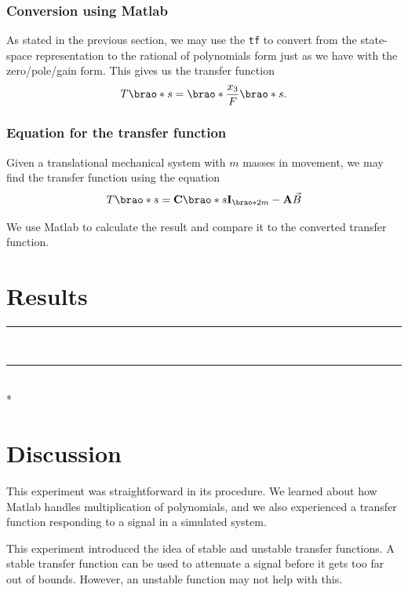 \documentclass[12pt]{article}
\DeclarePairedDelimiter\brao()%
\def\hr{{\par\noindent\rule{\textwidth}{0.4pt}}}
\begin{document}
\subsubsection{Conversion using Matlab}

As stated in the previous section,
we may use the \texttt{tf} to convert from the state-space representation to the rational of polynomials form
just as we have with the zero/pole/gain form.
This gives us the transfer function
\begin{equation}
    T\brao*s = \brao*{\frac{x_3}{F}}\brao*s.
\end{equation}

\subsubsection{Equation for the transfer function}

Given a translational mechanical system with $m$ masses in movement,
we may find the transfer function using the equation
\begin{equation}
    T\brao*s = \mathbf{C}\brao*{s\mathbf{I}_{\brao*{2m}} - \mathbf{A}}\vec{B}
\end{equation}

We use Matlab to calculate the result and compare it to the converted transfer function.

\section{Results}

\hr



\ \hr \\*



\section{Discussion}

This experiment was straightforward in its procedure.
We learned about how Matlab handles multiplication of polynomials,
and we also experienced a transfer function responding to a signal in a simulated system.

This experiment introduced the idea of stable and unstable transfer functions.
A stable transfer function can be used to attenuate a signal before it gets too far out of bounds.
However, an unstable function may not help with this.
\end{document}
